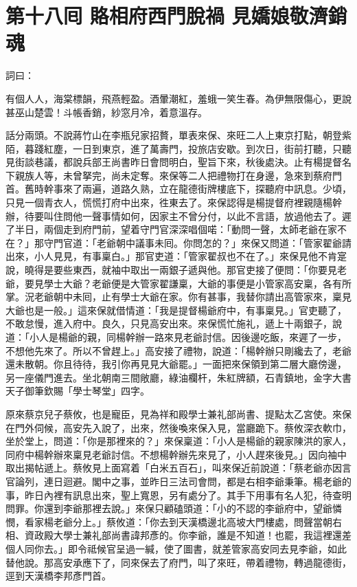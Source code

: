 
\chapter*{第十八囘 賂相府西門脫禍 見嬌娘敬濟銷魂}


詞曰：

\begin{myquote}
有個人人，海棠標韻，飛燕輕盈。酒暈潮紅，羞蛾一笑生春。為伊無限傷心，更說甚巫山楚雲！斗帳香銷，紗窓月冷，着意溫存。

\end{myquote}

話分兩頭。不說蔣竹山在李瓶兒家招贅，單表來保、來旺二人上東京打點，朝登紫陌，暮踐紅塵，一日到東京，進了萬壽門，投旅店安歇。到次日，街前打聽，只聽見街談巷議，都說兵部王尚書昨日會問明白，聖旨下來，秋後處決。止有楊提督名下親族人等，未曾拏完，尚未定奪。來保等二人把禮物打在身邊，急來到蔡府門首。舊時幹事來了兩遍，道路久熟，立在龍德街牌樓底下，探聽府中訊息。少頃，只見一個青衣人，慌慌打府中出來，徃東去了。來保認得是楊提督府裡親隨楊幹辦，待要叫住問他一聲事情如何，因家主不曾分付，以此不言語，放過他去了。遲了半日，兩個走到府門前，望着守門官深深唱個喏：「動問一聲，太師老爺在家不在？」那守門官道：「老爺朝中議事未囘。你問怎的？」來保又問道：「管家翟爺請出來，小人見見，有事稟白。」那官吏道：「管家翟叔也不在了。」來保見他不肯寔說，曉得是要些東西，就袖中取出一兩銀子遞與他。那官吏接了便問：「你要見老爺，要見學士大爺？老爺便是大管家翟謙稟，大爺的事便是小管家高安稟，各有所掌。況老爺朝中未囘，{}止有學士大爺在家。你有甚事，我替你請出高管家來，稟見大爺也是一般。」這來保就借情道：「我是提督楊爺府中，有事稟見。」官吏聽了，不敢怠慢，進入府中。良久，只見高安出來。來保慌忙施礼，遞上十兩銀子，說道：「小人是楊爺的親，同楊幹辦一路來見老爺討信。因後邊吃飯，來遲了一步，不想他先來了。所以不曾趕上。」高安接了禮物，說道：「楊幹辦只剛纔去了，老爺還未散朝。你且待待，我引你再見見大爺罷。」一面把來保領到第二層大廳傍邊，另一座儀門進去。坐北朝南三間敞廳，綠油欄杆，朱紅牌額，石青鎮地，金字大書天子御筆欽賜「學士琴堂」四字。

原來蔡京兒子蔡攸，也是寵臣，見為祥和殿學士兼礼部尚書、提點太乙宮使。來保在門外伺候，高安先入說了，出來，然後喚來保入見，當廳跪下。蔡攸深衣軟巾，坐於堂上，問道：「你是那裡來的？」來保稟道：「小人是楊爺的親家陳洪的家人，同府中楊幹辦來稟見老爺討信。不想楊幹辦先來見了，小人趕來後見。」因向袖中取出揭帖遞上。蔡攸見上面寫着「白米五百石」，叫來保近前說道：「蔡老爺亦因言官論列，連日迴避。閣中之事，並昨日三法司會問，都是右相李爺秉筆。楊老爺的事，昨日內裡有訊息出來，聖上寬恩，另有處分了。其手下用事有名人犯，待查明問罪。你還到李爺那裡去說。」來保只顧磕頭道：「小的不認的李爺府中，望爺憐憫，看家楊老爺分上。」蔡攸道：「你去到天漢橋邊北高坡大門樓處，問聲當朝右相、資政殿大學士兼礼部尚書諱邦彥的。{}你李爺，誰是不知道！也罷，我這裡還差個人同你去。」即令祗候官呈過一緘，使了圖書，就差管家高安同去見李爺，如此替他說。那高安承應下了，同來保去了府門，叫了來旺，帶着禮物，轉過龍德街，逕到天漢橋李邦彥門首。

